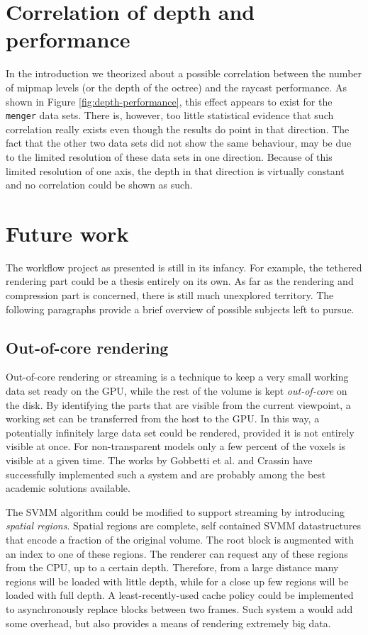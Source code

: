 \section{Correlation of depth and performance}
%
In the introduction we theorized about a possible correlation between the number of mipmap levels (or the depth of the octree) and the raycast performance. As shown in Figure \ref{fig:depth-performance}, this effect appears to exist for the \texttt{menger} data sets. There is, however, too little statistical evidence that such correlation really exists even though the results do point in that direction. The fact that the other two data sets did not show the same behaviour, may be due to the limited resolution of these data sets in one direction. Because of this limited resolution of one axis, the depth in that direction is virtually constant and no correlation could be shown as such.
%
\section{Future work} \label{sec:futurework}
%
The workflow project as presented is still in its infancy. For example, the tethered rendering part could be a thesis entirely on its own. As far as the rendering and compression part is concerned, there is still much unexplored territory. The following paragraphs provide a brief overview of possible subjects left to pursue.
%
\subsection{Out-of-core rendering} \label{sec:spatialregions}
%
Out-of-core rendering or streaming is a technique to keep a very small working data set ready on the GPU, while the rest of the volume is kept \emph{out-of-core} on the disk. By identifying the parts that are visible from the current viewpoint, a working set can be transferred from the host to the GPU. In this way, a potentially infinitely large data set could be rendered, provided it is not entirely visible at once. For non-transparent models only a few percent of the voxels is visible at a given time. The works by Gobbetti et al. \cite{gobbetti08} and Crassin \cite{crassin11} have successfully implemented such a system and are probably among the best academic solutions available.

The SVMM algorithm could be modified to support streaming by introducing \emph{spatial regions}. Spatial regions are complete, self contained SVMM datastructures that encode a fraction of the original volume. The root block is augmented with an index to one of these regions. The renderer can request any of these regions from the CPU, up to a certain depth. Therefore, from a large distance many regions will be loaded with little depth, while for a close up few regions will be loaded with full depth. A least-recently-used cache policy could be implemented to asynchronously replace blocks between two frames. Such system a would add some overhead, but also provides a means of rendering extremely big data.
%
